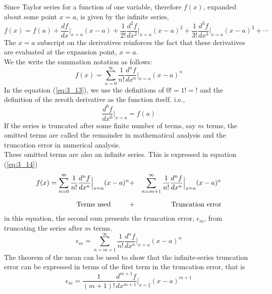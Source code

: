 \documentclass[12pt]{report}
\newcommand{\sps}{\\[0.2cm]}
\newcommand{\refn}[1]{(\ref{#1})}
\newcommand{\refx}[1]{\refn{eq:#1}}
\newcommand{\NI}{\noindent}
\begin{document}
	\NI Since Taylor series for a function of one variable, therefore $f(x)$, expanded about some point $x=a$, is given by the infinite series,
	\begin{equation}
		f(x) = f(a) + \frac{df}{dx}\Big|_{x=a} (x-a) + \frac{1}{2!}\frac{d^2f}{dx^2}\Big|_{x=a} (x-a)^2 +  \frac{1}{3!}\frac{d^3f}{dx^3}\Big|_{x=a} (x-a)^3 + \cdots \label{eq:3_12}
	\end{equation}
	The $x=a$ subscript on the derivatives reinforces the fact that these derivatives are evaluated at the expansion point, $x=a$.\sps
	
	\NI We the write the summation notation as follows:
	\begin{equation}
		f(x) = \sum_{n=0}^{\infty}\frac{1}{n!}\frac{d^nf}{dx^n}\Big|_{x=a}(x-a)^n \label{eq:3_13}
	\end{equation}
	In the equation \refx{3_13}, we use the definitions of $0!=1!=!$ and the definition of the zeroth derivative as the function itself. i.e.,
	\begin{equation*}
		\frac{d^0f}{dx^0}\Big|_{x=a} = f(a)
	\end{equation*}
	If the series is truncated after some finite number of terms, say $m$ terms, the omitted terms are called the remainder in mathematical analysis and the truncation error in numerical analysis.\sps
	
	\NI These omitted terms are also an infinite series. This is expressed in equation \refx{3_14}
	\begin{eqnarray}
		f(x) = \sum_{n=0}^{m}\frac{1}{n!}\frac{d^nf}{dx^n}\Big|_{x=a}(x-a)^n  &+& \sum_{n=m+1}^{\infty}\frac{1}{n!}\frac{d^nf}{dx^n}\Big|_{x=a}(x-a)^n \label{eq:3_14}\sps
		\text{Terms used}~~~~~~~~ & + & ~~~~\text{Truncation error}\notag
	\end{eqnarray}
	in this equation, the second sum presents the truncation error, $\epsilon_m$, from truncating the series after $m$ terms.
	\begin{equation}
		\epsilon_m = \sum_{n=m+1}^{\infty}\frac{1}{n!}\frac{d^nf}{dx^n}\Big|_{x=a}(x-a)^n\label{eq:3_15}
	\end{equation}
	The theorem of the mean can be used to show that the infinite-series truncation error can be expressed in terms of the first term in the truncation error, that is 
	\begin{equation}
		\epsilon_m =\frac{1}{(m+1)!}\frac{d^{m+1}f}{dx^{m+1}}\Big|_{x=\xi}(x-a)^{m+1}\label{eq:3_16}
	\end{equation}
	
\end{document}
